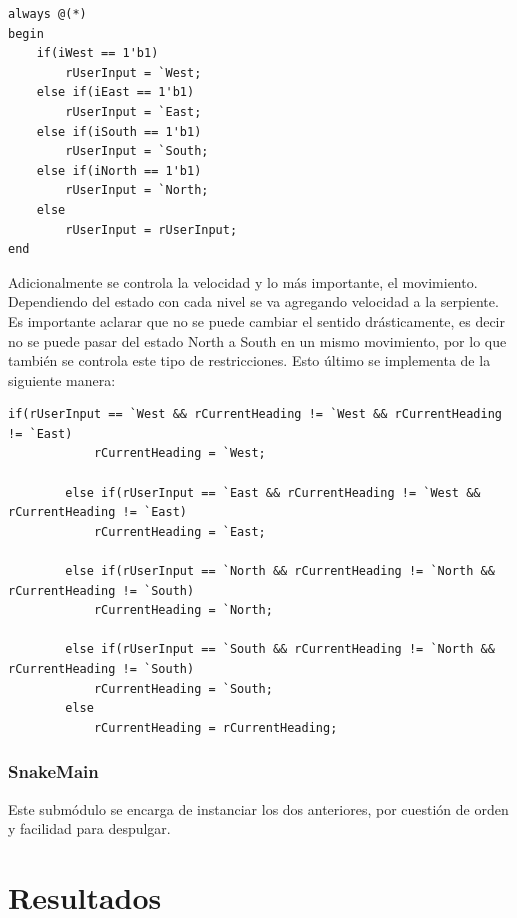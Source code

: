 \documentclass[10pt]{article}
\begin{document}
\begin{lstlisting}
always @(*)
begin
	if(iWest == 1'b1)
		rUserInput = `West;
	else if(iEast == 1'b1)
		rUserInput = `East;
	else if(iSouth == 1'b1) 
		rUserInput = `South;
	else if(iNorth == 1'b1)
		rUserInput = `North;
	else	
		rUserInput = rUserInput;
end
\end{lstlisting}

Adicionalmente se controla la velocidad y lo más importante, el movimiento. Dependiendo del estado con cada nivel se va agregando velocidad a la serpiente. Es importante aclarar que no se puede cambiar el sentido drásticamente, es decir no se puede pasar del estado North a South en un mismo movimiento, por lo que también se controla este tipo de restricciones. Esto último se implementa de la siguiente manera:

\begin{lstlisting}
if(rUserInput == `West && rCurrentHeading != `West && rCurrentHeading != `East)
			rCurrentHeading = `West;

		else if(rUserInput == `East && rCurrentHeading != `West && rCurrentHeading != `East)
			rCurrentHeading = `East;

		else if(rUserInput == `North && rCurrentHeading != `North && rCurrentHeading != `South)
			rCurrentHeading = `North;

		else if(rUserInput == `South && rCurrentHeading != `North && rCurrentHeading != `South)
			rCurrentHeading = `South;
		else
			rCurrentHeading = rCurrentHeading;
\end{lstlisting}

\subsubsection{SnakeMain}
Este submódulo se encarga de instanciar los dos anteriores, por cuestión de orden y facilidad para despulgar.

\section{Resultados}
\end{document}
